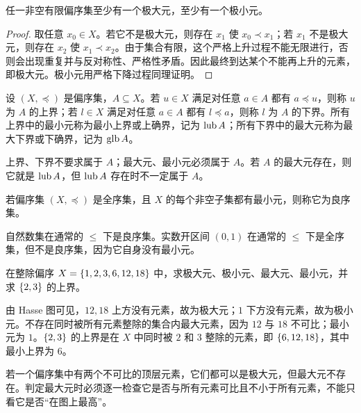\begin{theorem}[有限偏序集存在极大元和极小元]\label{ch2-finite-poset-extreme}
任一非空有限偏序集至少有一个极大元，至少有一个极小元。
\end{theorem}

\begin{proof}
取任意 $x_0\in X$。若它不是极大元，则存在 $x_1$ 使 $x_0\prec x_1$；若 $x_1$ 不是极大元，则存在 $x_2$ 使 $x_1\prec x_2$。由于集合有限，这个严格上升过程不能无限进行，否则会出现重复并与反对称性、严格性矛盾。因此最终到达某个不能再上升的元素，即极大元。极小元用严格下降过程同理证明。
\end{proof}

\begin{definition}\label{ch2-bounds}
设 $(X,\preceq)$ 是偏序集，$A\subseteq X$。若 $u\in X$ 满足对任意 $a\in A$ 都有 $a\preceq u$，则称 $u$ 为 $A$ 的上界；若 $l\in X$ 满足对任意 $a\in A$ 都有 $l\preceq a$，则称 $l$ 为 $A$ 的下界。所有上界中的最小元称为最小上界或上确界，记为 $\operatorname{lub} A$；所有下界中的最大元称为最大下界或下确界，记为 $\operatorname{glb} A$。
\end{definition}

上界、下界不要求属于 $A$；最大元、最小元必须属于 $A$。若 $A$ 的最大元存在，则它就是 $\operatorname{lub} A$，但 $\operatorname{lub} A$ 存在时不一定属于 $A$。

\begin{definition}[良序]\label{ch2-well-order}
若偏序集 $(X,\preceq)$ 是全序集，且 $X$ 的每个非空子集都有最小元，则称它为良序集。
\end{definition}

自然数集在通常的 $\le$ 下是良序集。实数开区间 $(0,1)$ 在通常的 $\le$ 下是全序集，但不是良序集，因为它自身没有最小元。

\begin{example}[title={偏序元素判定}]\label{ch2-poset-example}
在整除偏序 $X=\{1,2,3,6,12,18\}$ 中，求极大元、极小元、最大元、最小元，并求 $\{2,3\}$ 的上界。
\begin{solution}
由 Hasse 图可见，$12,18$ 上方没有元素，故为极大元；$1$ 下方没有元素，故为极小元。不存在同时被所有元素整除的集合内最大元素，因为 $12$ 与 $18$ 不可比；最小元为 $1$。$\{2,3\}$ 的上界是在 $X$ 中同时被 $2$ 和 $3$ 整除的元素，即 $\{6,12,18\}$，其中最小上界为 $6$。
\end{solution}
\end{example}

\begin{pitfall}[极大元不是最大元]\label{ch2-maximal-greatest-pitfall}
若一个偏序集中有两个不可比的顶层元素，它们都可以是极大元，但最大元不存在。判定最大元时必须逐一检查它是否与所有元素可比且不小于所有元素，不能只看它是否“在图上最高”。
\end{pitfall}
